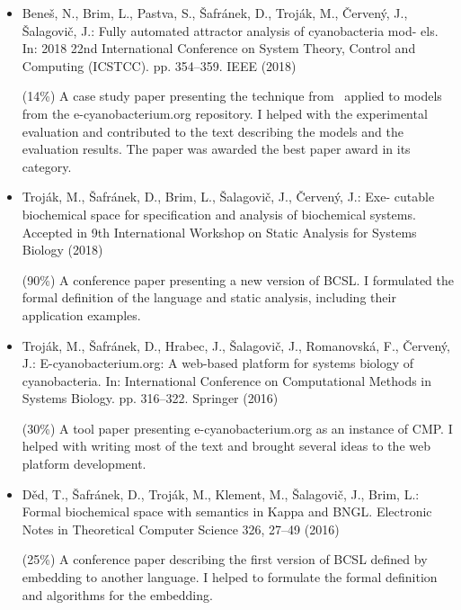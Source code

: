 \documentclass[11pt,a4paper]{report}
\newcounter{counter}[section]
\begin{document}
\begin{itemize}

\item Beneš, N., Brim, L., Pastva, S., Šafránek, D., Troják, M., Červený, J.,
Šalagovič, J.: Fully automated attractor analysis of cyanobacteria mod-
els. In: 2018 22nd International Conference on System Theory, Control
and Computing (ICSTCC). pp. 354--359. IEEE (2018)

(14\%) A case study paper presenting the technique from~\cite{barnat2017detecting} applied to models from the e-cyanobacterium.org repository. I helped with the experimental evaluation and contributed to the text describing the models and the
evaluation results. The paper was awarded the best paper award in its category.

\item Troják, M., Šafránek, D., Brim, L., Šalagovič, J., Červený, J.: Exe-
cutable biochemical space for specification and analysis of biochemical
systems. Accepted in 9th International Workshop on Static Analysis for
Systems Biology (2018)

(90\%) A conference paper presenting a new version of BCSL. I formulated the formal definition of the language and static analysis, including their application examples.

\item Troják, M., Šafránek, D., Hrabec, J., Šalagovič, J., Romanovská, F.,
Červený, J.: E-cyanobacterium.org: A web-based platform for systems
biology of cyanobacteria. In: International Conference on Computational
Methods in Systems Biology. pp. 316--322. Springer (2016)

(30\%) A tool paper presenting e-cyanobacterium.org as an instance of CMP. I helped with writing most of the text and brought several ideas to the web platform development.

\item Děd, T., Šafránek, D., Troják, M., Klement, M., Šalagovič, J., Brim, L.: Formal biochemical space with semantics in Kappa and BNGL. Electronic Notes in Theoretical Computer Science 326, 27–49 (2016)

(25\%) A conference paper describing the first version of BCSL defined by embedding to another language. I helped to formulate the formal definition and algorithms for the embedding.

\end{itemize}

\newpage
{}
\end{document}
